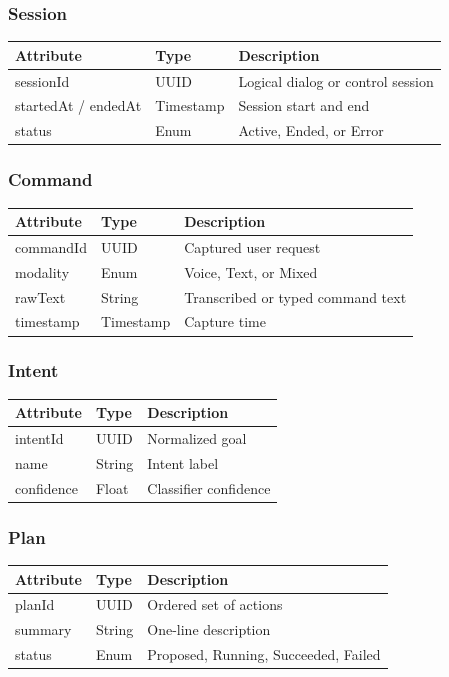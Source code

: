 \documentclass[12pt]{article}
\begin{document}
\subsubsection*{Session}
\noindent\begin{tabularx}{\textwidth}{@{} l l X @{}}
\toprule
\textbf{Attribute} & \textbf{Type} & \textbf{Description} \\
\midrule
sessionId & UUID & Logical dialog or control session \\
startedAt / endedAt & Timestamp & Session start and end \\
status & Enum & Active, Ended, or Error \\
\bottomrule
\end{tabularx}\par\medskip

\subsubsection*{Command}
\noindent\begin{tabularx}{\textwidth}{@{} l l X @{}}
\toprule
\textbf{Attribute} & \textbf{Type} & \textbf{Description} \\
\midrule
commandId & UUID & Captured user request \\
modality & Enum & Voice, Text, or Mixed \\
rawText & String & Transcribed or typed command text \\
timestamp & Timestamp & Capture time \\
\bottomrule
\end{tabularx}\par\medskip

\subsubsection*{Intent}
\noindent\begin{tabularx}{\textwidth}{@{} l l X @{}}
\toprule
\textbf{Attribute} & \textbf{Type} & \textbf{Description} \\
\midrule
intentId & UUID & Normalized goal \\
name & String & Intent label \\
confidence & Float & Classifier confidence \\
\bottomrule
\end{tabularx}\par\medskip

\subsubsection*{Plan}
\noindent\begin{tabularx}{\textwidth}{@{} l l X @{}}
\toprule
\textbf{Attribute} & \textbf{Type} & \textbf{Description} \\
\midrule
planId & UUID & Ordered set of actions \\
summary & String & One-line description \\
status & Enum & Proposed, Running, Succeeded, Failed \\
\bottomrule
\end{tabularx}\par\medskip
\end{document}
